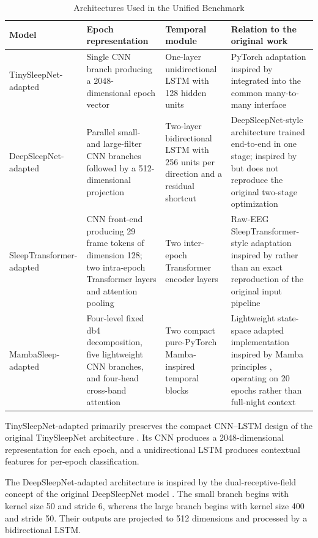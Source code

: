 \documentclass[conference]{IEEEtran}
\begin{document}
\begin{table}[t]
\centering
\caption{Architectures Used in the Unified Benchmark}
\label{tab:models}
\begin{tabular}{p{2.6cm}p{4.0cm}p{3.6cm}p{5.4cm}}
\toprule
Model & Epoch representation & Temporal module & Relation to the original work \\
\midrule
TinySleepNet-adapted &
Single CNN branch producing a 2048-dimensional epoch vector &
One-layer unidirectional LSTM with 128 hidden units &
PyTorch adaptation inspired by \cite{supratak2020tinysleepnet} integrated into the common many-to-many interface \\
DeepSleepNet-adapted &
Parallel small- and large-filter CNN branches followed by a 512-dimensional projection &
Two-layer bidirectional LSTM with 256 units per direction and a residual shortcut &
DeepSleepNet-style architecture trained end-to-end in one stage; inspired by \cite{supratak2017deepsleepnet} but does not reproduce the original two-stage optimization \\
SleepTransformer-adapted &
CNN front-end producing 29 frame tokens of dimension 128; two intra-epoch Transformer layers and attention pooling &
Two inter-epoch Transformer encoder layers &
Raw-EEG SleepTransformer-style adaptation inspired by \cite{phan2022sleeptransformer} rather than an exact reproduction of the original input pipeline \\
MambaSleep-adapted &
Four-level fixed db4 decomposition, five lightweight CNN branches, and four-head cross-band attention &
Two compact pure-PyTorch Mamba-inspired temporal blocks &
Lightweight state-space adapted implementation inspired by Mamba principles \cite{gu2023mamba}, operating on 20 epochs rather than full-night context \\
\bottomrule
\end{tabular}
\end{table}

TinySleepNet-adapted primarily preserves the compact CNN--LSTM design of the original TinySleepNet architecture \cite{supratak2020tinysleepnet}. Its CNN produces a 2048-dimensional representation for each epoch, and a unidirectional LSTM produces contextual features for per-epoch classification.

The DeepSleepNet-adapted architecture is inspired by the dual-receptive-field concept of the original DeepSleepNet model \cite{supratak2017deepsleepnet}. The small branch begins with kernel size 50 and stride 6, whereas the large branch begins with kernel size 400 and stride 50. Their outputs are projected to 512 dimensions and processed by a bidirectional LSTM.
\end{document}
